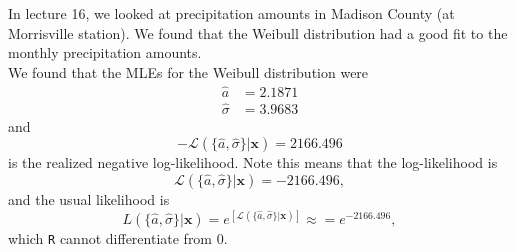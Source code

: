 \documentclass{article}\usepackage[]{graphicx}\usepackage[]{xcolor}
\begin{document}
In lecture 16, we looked at precipitation amounts in Madison County (at 
Morrisville station). We found that the Weibull distribution had a good fit
to the monthly precipitation amounts.\\


We found that the MLEs for the Weibull distribution were 
\begin{align*}
    \hat{a}&=2.1871\\
    \hat{\sigma}&=3.9683
\end{align*}
and
\[-\mathcal{L}(\{\hat{a}, \hat{\sigma}\}|\mathbf{x}) = 2166.496\]
is the realized negative log-likelihood.
Note this means that the log-likelihood is
\[\mathcal{L}(\{\hat{a}, \hat{\sigma}\}|\mathbf{x}) = -2166.496,\]
and the usual likelihood is
\[L(\{\hat{a}, \hat{\sigma}\}|\mathbf{x}) = e^{\left[\mathcal{L}(\{\hat{a}, \hat{\sigma}\}|\mathbf{x})\right]} \approx = e^{-2166.496},\]
which \texttt{R} cannot differentiate from 0.
\end{document}
